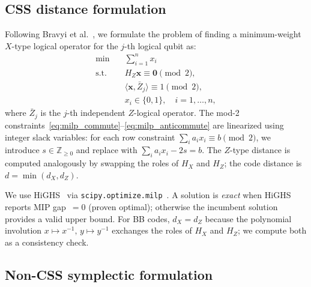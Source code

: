 \documentclass[aps,prxquantum,twocolumn,superscriptaddress,nofootinbib]{revtex4-2}
\newcommand{\ZZ}{\ensuremath{\mathbb{Z}}}
\begin{document}
\subsection{CSS distance formulation}

Following Bravyi et al.~\cite{bravyi2024high}, we formulate the problem of finding a minimum-weight $X$-type logical operator for the $j$-th logical qubit as:
\begin{align}
\min \quad & \sum_{i=1}^{n} x_i \label{eq:milp_obj}\\
\text{s.t.} \quad & H_Z \mathbf{x} \equiv \mathbf{0} \pmod{2}, \label{eq:milp_commute}\\
& \langle \mathbf{x}, \bar{Z}_j \rangle \equiv 1 \pmod{2}, \label{eq:milp_anticommute}\\
& x_i \in \{0,1\}, \quad i = 1, \ldots, n, \label{eq:milp_binary}
\end{align}
where $\bar{Z}_j$ is the $j$-th independent $Z$-logical operator.
The mod-2 constraints~\eqref{eq:milp_commute}--\eqref{eq:milp_anticommute} are linearized using integer slack variables: for each row constraint $\sum_i a_i x_i \equiv b \pmod{2}$, we introduce $s \in \ZZ_{\geq 0}$ and replace with $\sum_i a_i x_i - 2s = b$.
The $Z$-type distance is computed analogously by swapping the roles of $H_X$ and $H_Z$; the code distance is $d = \min(d_X, d_Z)$.

We use HiGHS~\cite{huangfu2018highs} via \texttt{scipy.optimize.milp}~\cite{virtanen2020scipy}.
A solution is \emph{exact} when HiGHS reports MIP gap~$= 0$ (proven optimal); otherwise the incumbent solution provides a valid upper bound.
For BB codes, $d_X = d_Z$ because the polynomial involution $x \mapsto x^{-1},\, y \mapsto y^{-1}$ exchanges the roles of $H_X$ and $H_Z$; we compute both as a consistency check.

\subsection{Non-CSS symplectic formulation}
\end{document}
